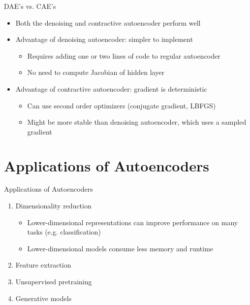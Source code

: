 \documentclass[handout]{beamer}
\begin{document}



\begin{frame}[t]{DAE's vs. CAE's }
    \begin{itemize}
        \item Both the denoising and contractive autoencoder perform well
            \pause
        \item Advantage of denoising autoencoder: simpler to implement
            \pause
            \begin{itemize}
                \item Requires adding one or two lines of code to regular autoencoder
            \pause
                \item No need to compute Jacobian of hidden layer
            \end{itemize}
            \pause
        \item Advantage of contractive autoencoder: gradient is deterministic
            \pause
            \begin{itemize}
                \item Can use second order optimizers (conjugate gradient, LBFGS)
            \pause
                \item Might be more stable than denoising autoencoder, which uses a sampled gradient
            \end{itemize}
    \end{itemize}  
\end{frame}


\section{Applications of Autoencoders}
\begin{frame}[t]{Applications of Autoencoders}
    \begin{enumerate}
        \pause
        \item Dimensionality reduction
            \begin{itemize}
                \item Lower-dimensional representations can improve performance on many tasks (e.g. classification)
                \item Lower-dimensional models consume less memory and runtime
            \end{itemize}
\pause
\item Feature extraction
\pause
\item Unsupervised pretraining
            \pause
\item Generative models
    \end{enumerate}
\end{frame}
\end{document}
